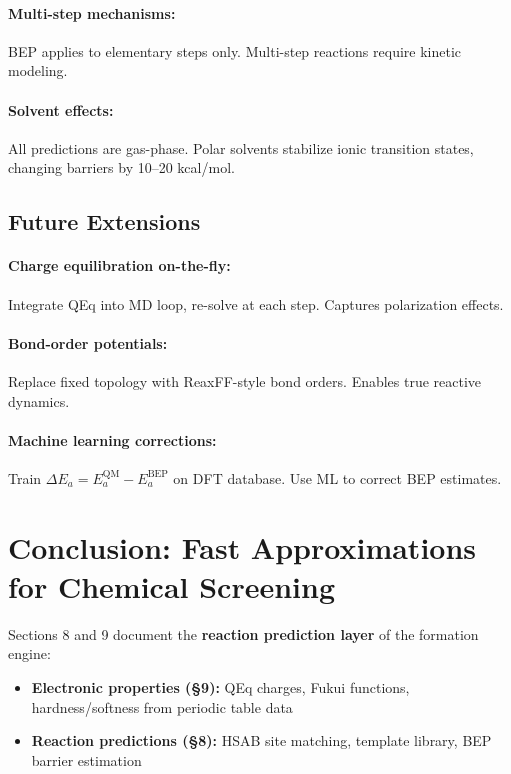 \documentclass[11pt]{article}
\begin{document}
\paragraph{Multi-step mechanisms:}
BEP applies to elementary steps only. Multi-step reactions require kinetic modeling.

\paragraph{Solvent effects:}
All predictions are gas-phase. Polar solvents stabilize ionic transition states, changing barriers by 10--20 kcal/mol.

\subsection{Future Extensions}

\paragraph{Charge equilibration on-the-fly:}
Integrate QEq into MD loop, re-solve at each step. Captures polarization effects.

\paragraph{Bond-order potentials:}
Replace fixed topology with ReaxFF-style bond orders. Enables true reactive dynamics.

\paragraph{Machine learning corrections:}
Train $\Delta E_a = E_a^{\text{QM}} - E_a^{\text{BEP}}$ on DFT database. Use ML to correct BEP estimates.

\section{Conclusion: Fast Approximations for Chemical Screening}

Sections 8 and 9 document the \textbf{reaction prediction layer} of the formation engine:

\begin{itemize}
\item \textbf{Electronic properties (§9):} QEq charges, Fukui functions, hardness/softness from periodic table data
\item \textbf{Reaction predictions (§8):} HSAB site matching, template library, BEP barrier estimation
\end{itemize}
\end{document}
